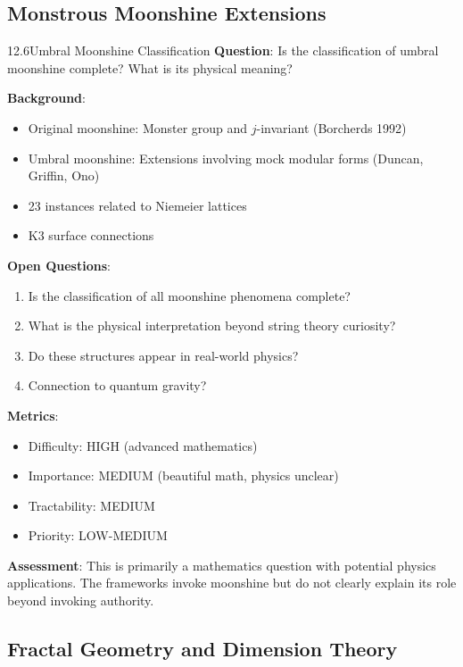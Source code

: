 \subsection{Monstrous Moonshine Extensions}

\begin{openproblem}{12.6}{Umbral Moonshine Classification}
\textbf{Question}: Is the classification of umbral moonshine complete? What is its physical meaning?

\textbf{Background}:
\begin{itemize}
    \item Original moonshine: Monster group and $j$-invariant (Borcherds 1992)
    \item Umbral moonshine: Extensions involving mock modular forms (Duncan, Griffin, Ono)
    \item 23 instances related to Niemeier lattices
    \item K3 surface connections
\end{itemize}

\textbf{Open Questions}:
\begin{enumerate}
    \item Is the classification of all moonshine phenomena complete?
    \item What is the physical interpretation beyond string theory curiosity?
    \item Do these structures appear in real-world physics?
    \item Connection to quantum gravity?
\end{enumerate}

\textbf{Metrics}:
\begin{itemize}
    \item Difficulty: HIGH (advanced mathematics)
    \item Importance: MEDIUM (beautiful math, physics unclear)
    \item Tractability: MEDIUM
    \item Priority: LOW-MEDIUM
\end{itemize}

\textbf{Assessment}: This is primarily a mathematics question with potential physics applications. The frameworks invoke moonshine but do not clearly explain its role beyond invoking authority.
\end{openproblem}

\subsection{Fractal Geometry and Dimension Theory}

